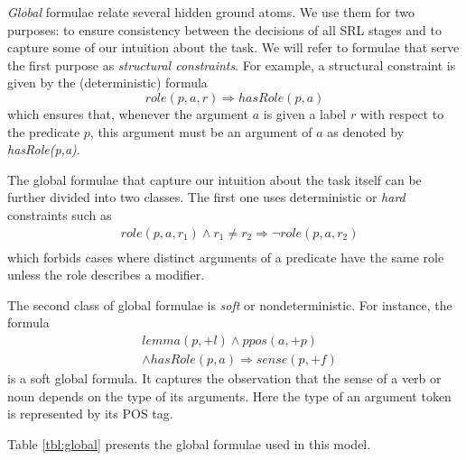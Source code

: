 
\emph{Global} formulae relate several hidden ground atoms. We use them for two 
purposes: to ensure consistency between the decisions of all SRL stages and to 
capture some of our intuition about the task. We will refer to formulae that 
serve the first purpose as \emph{structural constraints}. For example, a 
structural constraint is given by the (deterministic) formula
\[role(p,a,r) \Rightarrow hasRole(p,a)\]
which ensures that, whenever the argument $a$ is given a label $r$ with respect 
to the predicate $p$, this argument must be an argument of $a$ as denoted by 
\emph{hasRole(p,a)}.

The global formulae that capture our intuition about the task itself can be 
further divided into two classes. The first one uses deterministic or 
\emph{hard} constraints such as
\begin{eqnarray*}
       & role(p,a,r_1) \wedge r_1 \neq r_2 \Rightarrow \neg role(p,a,r_2)\\
\end{eqnarray*}
which forbids cases where distinct arguments of a predicate have the same role 
unless the role describes a modifier.

The second class of global formulae is \emph{soft} or nondeterministic. For 
instance, the formula
\begin{eqnarray*}
  & lemma(p,+l) \wedge ppos(a,+p)  \\
  & \wedge hasRole(p,a)  \Rightarrow sense(p,+f) 
\end{eqnarray*}
is a soft global formula. It captures the observation that the sense of a verb 
or noun depends on the type of its arguments. Here the type of an argument token 
is represented by its POS tag.

Table \ref{tbl:global} presents the global formulae used in this model. 

